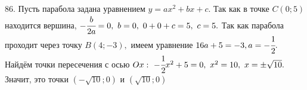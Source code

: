 86. Пусть парабола задана уравнением $y=ax^2+bx+c.$ Так как в точке $C(0;5)$ находится вершина, $-\cfrac{b}{2a}=0,\ b=0,\ 0+0+c=5,\ c=5.$ Так как парабола проходит через точку $B(4;-3),$ имеем уравнение $16a+5=-3, a=-\cfrac{1}{2}.$ Найдём точки пересечения с осью $Ox:\ -\cfrac{1}{2}x^2+5=0,\ x^2=10,\ x=\pm\sqrt{10}.$ Значит, это точки $(-\sqrt{10};0)$ и $(\sqrt{10};0)$\\
